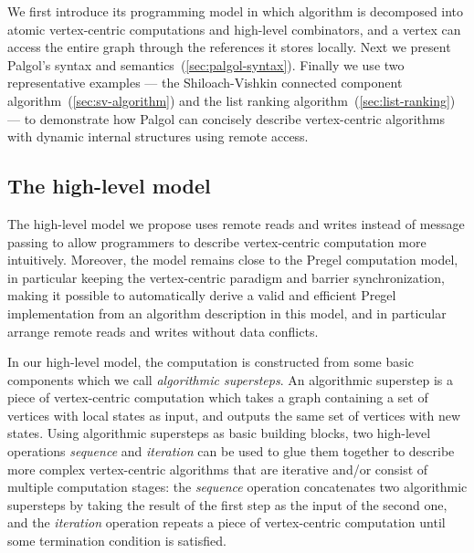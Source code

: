 \documentclass{sokendai_thesis} %
\begin{document}
We first introduce its programming model in which algorithm is decomposed into atomic vertex-centric computations and high-level combinators, and a vertex can access the entire graph through the references it stores locally.
Next we present Palgol's syntax and semantics~(\autoref{sec:palgol-syntax}).
Finally we use two representative examples --- the Shiloach-Vishkin connected component algorithm~(\autoref{sec:sv-algorithm}) and the list ranking algorithm~(\autoref{sec:list-ranking}) --- to demonstrate how Palgol can concisely describe vertex-centric algorithms with dynamic internal structures using remote access.

\subsection{The high-level model}
\label{sec:model}


The high-level model we propose uses remote reads and writes instead of message passing to allow programmers to describe vertex-centric computation more intuitively. %
Moreover, the model remains close to the Pregel computation model, in particular keeping the vertex-centric paradigm and barrier synchronization, making it possible to automatically derive a valid and efficient Pregel implementation from an algorithm description in this model, and in particular arrange remote reads and writes without data conflicts.


In our high-level model, the computation is constructed from some basic components which we call \emph{algorithmic supersteps}.
An algorithmic superstep is a piece of vertex-centric computation which takes a graph containing a set of vertices with local states as input, and outputs the same set of vertices with new states.
Using algorithmic supersteps as basic building blocks, two high-level operations \emph{sequence} and \emph{iteration} can be used to glue them together to describe more complex vertex-centric algorithms that are iterative and/or consist of multiple computation stages:
the \emph{sequence} operation concatenates two algorithmic supersteps by taking the result of the first step as the input of the second one, and the \emph{iteration} operation repeats a piece of vertex-centric computation until some termination condition is satisfied.
\end{document}
